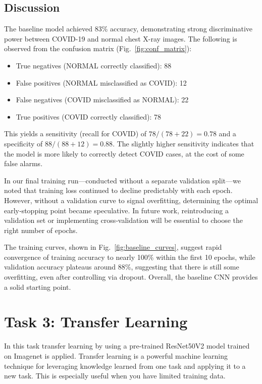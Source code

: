 \documentclass[conference]{IEEEtran}
\begin{document}
\subsection{Discussion}
The baseline model achieved 83\% accuracy, demonstrating strong discriminative power between COVID-19 and normal chest X-ray images. The following is observed from the confusion matrix (Fig.~\ref{fig:conf_matrix}):

\begin{itemize}
	\item True negatives (NORMAL correctly classified): 88
	\item False positives (NORMAL misclassified as COVID): 12
	\item False negatives (COVID misclassified as NORMAL): 22
	\item True positives (COVID correctly classified): 78
\end{itemize}
\vspace{0.5cm}

This yields a sensitivity (recall for COVID) of $78/(78+22)=0.78$ and a specificity of $88/(88+12)=0.88$. The slightly higher sensitivity indicates that the model is more likely to correctly detect COVID cases, at the cost of some false alarms.  

In our final training run—conducted without a separate validation split—we noted that training loss continued to decline predictably with each epoch. However, without a validation curve to signal overfitting, determining the optimal early‑stopping point became speculative. In future work, reintroducing a validation set or implementing cross‑validation will be essential to choose the right number of epochs.

The training curves, shown in Fig.~\ref{fig:baseline_curves}, suggest rapid convergence of training accuracy to nearly 100\% within the first 10 epochs, while validation accuracy plateaus around 88\%, suggesting that there is still some overfitting, even after controlling via dropout. Overall, the baseline CNN provides a solid starting point.

\vspace{1cm}
\section{Task 3: Transfer Learning} \label{sec:task_3}
In this task transfer learning by using a pre-trained ResNet50V2 model trained on Imagenet is applied. Transfer learning is a powerful machine learning technique for leveraging knowledge learned from one task and applying it to a new task. This is especially useful when you have limited training data.
\end{document}
